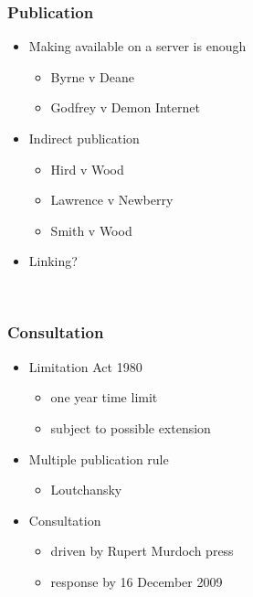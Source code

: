 \documentclass[ignorenonframetext,]{beamer}
\begin{document}
\begin{frame}
\frametitle{Publication}

\begin{itemize}
\item  Making available on a server is enough

  \begin{itemize}
  \item    Byrne v Deane
  \item    Godfrey v Demon Internet
  \end{itemize}
\item  Indirect publication

  \begin{itemize}
  \item    Hird v Wood
  \item    Lawrence v Newberry
  \item    Smith v Wood
  \end{itemize}
\item  Linking?
\end{itemize}

~


\end{frame}

\begin{frame}
\frametitle{Consultation}

\begin{itemize}
\item  Limitation Act 1980

  \begin{itemize}
  \item    one year time limit
  \item    subject to possible extension
  \end{itemize}
\item  Multiple publication rule

  \begin{itemize}
  \item    Loutchansky
  \end{itemize}
\item  Consultation

  \begin{itemize}
  \item    driven by Rupert Murdoch press
  \item    response by 16 December 2009
  \end{itemize}
\end{itemize}

~

\end{frame}
\end{document}
